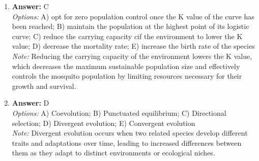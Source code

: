 \documentclass[12pt]{article}
\begin{document}
\begin{enumerate}[label=\arabic*.]
\item \textbf{Answer:} C
\\ \textit{Options:} A) opt for zero population control once the K value of the curve has been reached; B) maintain the population at the highest point of its logistic curve; C) reduce the carrying capacity cif the environment to lower the K value; D) decrease the mortality rate; E) increase the birth rate of the species
\\ \textit{Note:} Reducing the carrying capacity of the environment lowers the K value, which decreases the maximum sustainable population size and effectively controls the mosquito population by limiting resources necessary for their growth and survival.
\item \textbf{Answer:} D
\\ \textit{Options:} A) Coevolution; B) Punctuated equilibrium; C) Directional selection; D) Divergent evolution; E) Convergent evolution
\\ \textit{Note:} Divergent evolution occurs when two related species develop different traits and adaptations over time, leading to increased differences between them as they adapt to distinct environments or ecological niches.
\end{enumerate}
\end{document}
